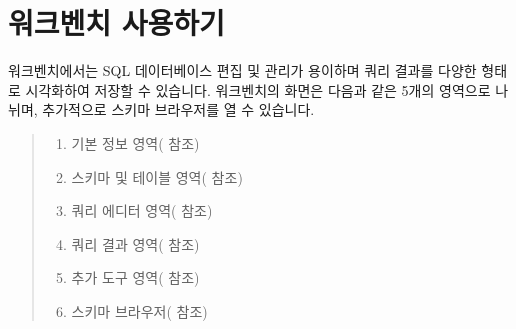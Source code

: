 \documentclass[letterpaper,10pt,english]{sphinxmanual}
\begin{document}
\section{워크벤치 사용하기}
\label{\detokenize{discovery/part06/06_03-use_a_workbench:id1}}\label{\detokenize{discovery/part06/06_03-use_a_workbench::doc}}
워크벤치에서는 SQL 데이터베이스 편집 및 관리가 용이하며 쿼리 결과를 다양한 형태로 시각화하여 저장할 수 있습니다. 워크벤치의 화면은 다음과 같은 5개의 영역으로 나뉘며, 추가적으로 스키마 브라우저를 열 수 있습니다.
\begin{quote}

\begin{figure}[H]
\centering

\noindent{}
\end{figure}
\begin{enumerate}
\def\theenumi{\arabic{enumi}}
\def\labelenumi{\theenumi .}
\makeatletter\def\p@enumii{\p@enumi \theenumi .}\makeatother
\item {} 
기본 정보 영역({\hyperref[\detokenize{discovery/part06/06_03-use_a_workbench:workbench-use-1}]{}} 참조)

\item {} 
스키마 및 테이블 영역({\hyperref[\detokenize{discovery/part06/06_03-use_a_workbench:workbench-use-2}]{}} 참조)

\item {} 
쿼리 에디터 영역({\hyperref[\detokenize{discovery/part06/06_03-use_a_workbench:workbench-use-3}]{}} 참조)

\item {} 
쿼리 결과 영역({\hyperref[\detokenize{discovery/part06/06_03-use_a_workbench:workbench-use-4}]{}} 참조)

\item {} 
추가 도구 영역({\hyperref[\detokenize{discovery/part06/06_03-use_a_workbench:workbench-use-5}]{}} 참조)

\item {} 
스키마 브라우저({\hyperref[\detokenize{discovery/part06/06_03-use_a_workbench:workbench-use-6}]{}} 참조)

\end{enumerate}
\end{quote}
\end{document}
